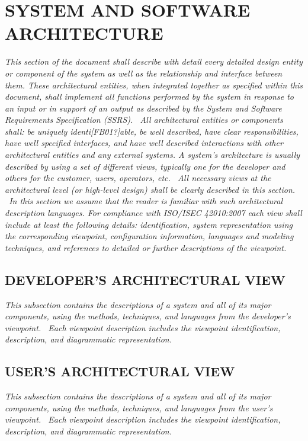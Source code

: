 \documentclass[twoside,letterpaper]{article}
\begin{document}
\section[SYSTEM AND SOFTWARE
ARCHITECTURE]{\bfseries\color{black} SYSTEM AND
SOFTWARE ARCHITECTURE}
{\itshape\color{black}
This section of the document shall describe with detail every detailed
design entity or component of the system as well as the relationship
and interface between them. These architectural entities, when
integrated together as specified within this document, shall implement
all functions performed by the system in response to an input or in
support of an output as described by the System and Software
Requirements Specification (SSRS). \ All architectural entities or
components shall: be uniquely identi[FB01?]able, be well described,
have clear responsibilities, have well specified interfaces, and have
well described interactions with other architectural entities and any
external systems. A system{\textquoteright}s architecture is usually
described by using a set of different views, typically one for the
developer and others for the customer, users, operators, etc. \ All
necessary views at the architectural level (or high-level design) shall
be clearly described in this section. \ In this section we assume that
the reader is familiar with such architectural description languages.
For compliance with ISO/ISEC 42010:2007 each view shall include
at least the following details: identification, system representation
using the corresponding viewpoint, configuration information, languages
and modeling techniques, and references to detailed or further
descriptions of the viewpoint. \ }

\subsection[DEVELOPER{\textquoteright}S ARCHITECTURAL
VIEW]{\bfseries\color{black}
DEVELOPER{\textquoteright}S ARCHITECTURAL VIEW}
{\itshape\color{black}
This subsection contains the descriptions of a system and all of its
major components, using the methods, techniques, and languages from the
developer{\textquoteright}s viewpoint. \ Each viewpoint description
includes the viewpoint identification, description, and diagrammatic
representation. }

\subsection[USER{\textquoteright}S ARCHITECTURAL
VIEW]{\bfseries\color{black}
USER{\textquoteright}S ARCHITECTURAL VIEW}
{\itshape\color{black}
This subsection contains the descriptions of a system and all of its
major components, using the methods, techniques, and languages from the
user{\textquoteright}s viewpoint. \ Each viewpoint description includes
the viewpoint identification, description, and diagrammatic
representation. }
\end{document}
